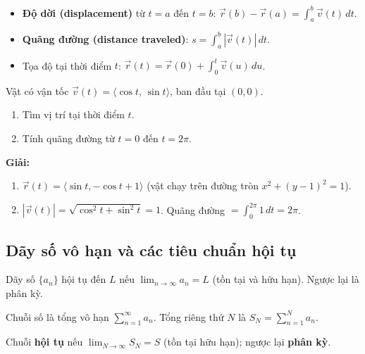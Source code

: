 \documentclass[12pt,a4paper]{article}
\begin{document}
\begin{congthuc}[title={Quãng đường và độ dời}]
  \begin{itemize}
    \item \textbf{Độ dời (displacement)} từ $t=a$ đến $t=b$: $\vec{r}(b) - \vec{r}(a) = \displaystyle\int_a^b \vec{v}(t)\,dt$.
    \item \textbf{Quãng đường (distance traveled)}: $s = \displaystyle\int_a^b |\vec{v}(t)|\,dt$.
    \item Tọa độ tại thời điểm $t$: $\vec{r}(t) = \vec{r}(0) + \displaystyle\int_0^t \vec{v}(u)\,du$.
  \end{itemize}
\end{congthuc}

\begin{vidu}
  Vật có vận tốc $\vec{v}(t) = \langle \cos t,\, \sin t \rangle$, ban đầu tại $(0,0)$.
  \begin{enumerate}[label=(\alph*)]
    \item Tìm vị trí tại thời điểm $t$.
    \item Tính quãng đường từ $t=0$ đến $t = 2\pi$.
  \end{enumerate}

  \medskip\textbf{Giải:}
  \begin{enumerate}[label=(\alph*)]
    \item $\vec{r}(t) = \langle \sin t, -\cos t + 1 \rangle$ (vật chạy trên đường tròn $x^2 + (y-1)^2 = 1$).
    \item $|\vec{v}(t)| = \sqrt{\cos^2 t + \sin^2 t} = 1$. Quãng đường $= \displaystyle\int_0^{2\pi} 1\,dt = 2\pi$.
  \end{enumerate}
\end{vidu}

\subsection{Dãy số vô hạn và các tiêu chuẩn hội tụ}

\begin{dinhnghia}[title={Dãy số và giới hạn}]
  Dãy số $\{a_n\}$ hội tụ đến $L$ nếu $\displaystyle\lim_{n\to\infty} a_n = L$ (tồn tại và hữu hạn). Ngược lại là phân kỳ.
\end{dinhnghia}

\begin{dinhnghia}[title={Chuỗi số (Series)}]
  Chuỗi số là tổng vô hạn $\displaystyle\sum_{n=1}^\infty a_n$. Tổng riêng thứ $N$ là $S_N = \displaystyle\sum_{n=1}^N a_n$.

  Chuỗi \textbf{hội tụ} nếu $\displaystyle\lim_{N\to\infty} S_N = S$ (tồn tại hữu hạn); ngược lại \textbf{phân kỳ}.
\end{dinhnghia}
\end{document}
